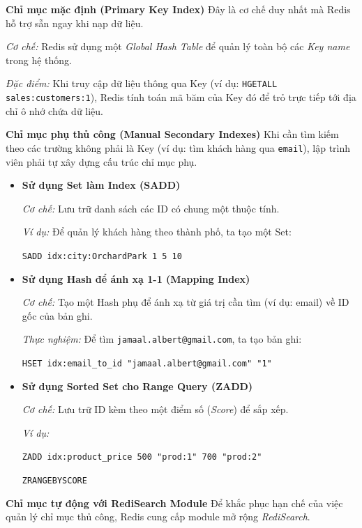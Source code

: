 \noindent\textbf{ Chỉ mục mặc định (Primary Key Index)} Đây là cơ chế duy nhất mà Redis hỗ trợ sẵn ngay khi nạp dữ liệu.

\textit{Cơ chế:} Redis sử dụng một \textit{Global Hash Table} để quản lý toàn bộ
các \textit{Key name} trong hệ thống.

\textit{Đặc điểm:} Khi truy cập dữ liệu thông qua Key (ví dụ:
\texttt{HGETALL sales:customers:1}), Redis tính toán mã băm của Key đó
để trỏ trực tiếp tới địa chỉ ô nhớ chứa dữ liệu.

\vspace{1em}

\noindent\textbf{ Chỉ mục phụ thủ công (Manual Secondary Indexes)} Khi cần tìm kiếm theo các trường không phải là Key (ví dụ: tìm khách hàng qua \texttt{email}), lập trình viên phải tự xây dựng cấu trúc chỉ mục phụ.

\begin{itemize}

\item \textbf{Sử dụng Set làm Index (SADD)}

\textit{Cơ chế:} Lưu trữ danh sách các ID có chung một thuộc tính.

\textit{Ví dụ:} Để quản lý khách hàng theo thành phố, ta tạo một Set:

\texttt{SADD idx:city:OrchardPark 1 5 10}

\item \textbf{Sử dụng Hash để ánh xạ 1-1 (Mapping Index)}

\textit{Cơ chế:} Tạo một Hash phụ để ánh xạ từ giá trị cần tìm (ví dụ: email)
về ID gốc của bản ghi.

\textit{Thực nghiệm:} Để tìm \texttt{jamaal.albert@gmail.com}, ta tạo bản ghi:

\texttt{HSET idx:email\_to\_id "jamaal.albert@gmail.com" "1"}


\item \textbf{Sử dụng Sorted Set cho Range Query (ZADD)}

\textit{Cơ chế:} Lưu trữ ID kèm theo một điểm số (\textit{Score}) để sắp xếp.

\textit{Ví dụ:}

\texttt{ZADD idx:product\_price 500 "prod:1" 700 "prod:2"}

\texttt{ZRANGEBYSCORE}

\end{itemize}

\vspace{0.5em}

\noindent\textbf{Chỉ mục tự động với RediSearch Module} Để khắc phục hạn chế của việc quản lý chỉ mục thủ công, Redis cung cấp module mở rộng \textit{RediSearch}.

